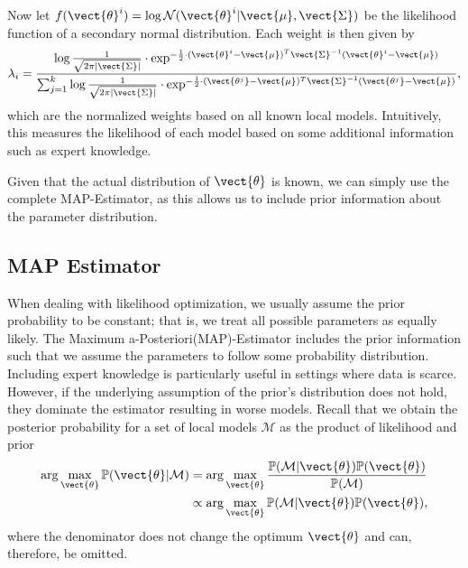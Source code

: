 Now let $f(\vect{\theta}^i) = \log \mathcal{N}(\vect{\theta}^i \lvert \vect{\mu}, \vect{\Sigma})$ be the likelihood function of a secondary normal distribution.
Each weight is then given by
\begin{equation}
    \label{eq:normll}
    \lambda_i = \frac{\log \frac{1}{\sqrt{2\pi\lvert \vect{\Sigma} \rvert}} \cdot \exp^{-\frac{1}{2} \cdot (\vect{\theta}^i - \vect{\mu})^T\vect{\Sigma}^{-1}(\vect{\theta}^i - \vect{\mu})}}{\sum_{j=1}^k \log \frac{1}{\sqrt{2\pi\lvert \vect{\Sigma} \rvert}} \cdot \exp^{-\frac{1}{2} \cdot (\vect{\theta^j} - \vect{\mu})^T\vect{\Sigma}^{-1}(\vect{\theta^j} - \vect{\mu})}},
\end{equation}
which are the normalized weights based on all known local models.
Intuitively, this measures the likelihood of each model based on some additional information such as expert knowledge.

Given that the actual distribution of $\vect{\theta}$ is known, we can simply use the complete MAP-Estimator, as this allows us to include prior information about the parameter distribution.

\subsection{MAP Estimator}
When dealing with likelihood optimization, we usually assume the prior probability to be constant; that is, we treat all possible parameters as equally likely.
The Maximum a-Posteriori(MAP)-Estimator includes the prior information such that we assume the parameters to follow some probability distribution.
Including expert knowledge is particularly useful in settings where data is scarce.
However, if the underlying assumption of the prior's distribution does not hold, they dominate the estimator resulting in worse models.
Recall that we obtain the posterior probability for a set of local models $\mathcal{M}$ as the product of likelihood and prior
\begin{equation}
    \begin{split}
    \arg\max_{\vect{\theta}}\mathbb{P}(\vect{\theta} \lvert \mathcal{M} ) &= \arg\max_{\vect{\theta}} \frac{\mathbb{P}(\mathcal{M}\lvert \vect{\theta}) \mathbb{P}(\vect{\theta}) }{\mathbb{P}(\mathcal{M})} \\
    &\propto  \arg\max_{\vect{\theta}}\mathbb{P}(\mathcal{M}\lvert \vect{\theta}) \mathbb{P}(\vect{\theta})  ,
    \end{split}
\end{equation}
where the denominator does not change the optimum \wrt $\vect{\theta}$ and can, therefore, be omitted.

